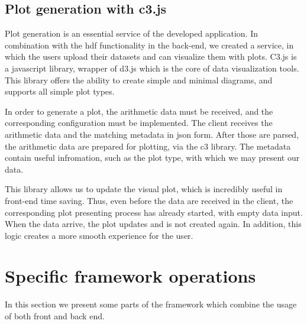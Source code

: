 \subsection{Plot generation with c3.js}
Plot generation is an essential service of the developed application. In combination with the hdf functionality in the back-end, we created a service, in which the users upload their datasets and can visualize them with plots. C3.js is a javascript library, wrapper of d3.js which is the core of data visualization tools. This library offers the ability to create simple and minimal diagrams, and supports all simple plot types. \par 
	In order to generate a plot, the arithmetic data must be received, and the corresponding configuration must be implemented. The client receives the arithmetic data and the matching metadata in json form. After those are parsed, the arithmetic data are prepared for plotting, via the c3 library. The metadata contain useful infromation, such as the plot type, with which we may present our data. \par 
	This library allows us to update the visual plot, which is incredibly useful in front-end time saving. Thus, even before the data are received in the client, the corresponding plot presenting process has already started, with empty data input. When the data arrive, the plot updates and is not created again. In addition, this logic creates a more smooth experience for the user.
	
\section{Specific framework operations}
In this section we present some parts of the framework which combine the usage of both front and back end.

